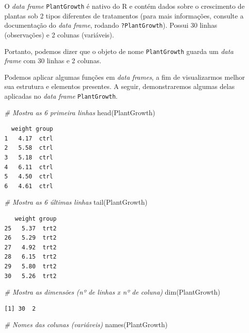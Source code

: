 \documentclass[
  brazilian,
]{book}
\newenvironment{Shaded}{\begin{snugshade}}{\end{snugshade}}
\newcommand{\CommentTok}[1]{\textcolor[rgb]{0.56,0.35,0.01}{\textit{#1}}}
\newcommand{\FunctionTok}[1]{\textcolor[rgb]{0.00,0.00,0.00}{#1}}
\newcommand{\NormalTok}[1]{#1}
\begin{document}
O \emph{data frame} \texttt{PlantGrowth} é nativo do R e contém dados sobre o crescimento de plantas sob 2 tipos diferentes de tratamentos (para mais informações, consulte a documentação do \emph{data frame}, rodando \texttt{?PlantGrowth}). Possui 30 linhas (observações) e 2 colunas (variáveis).

Portanto, podemos dizer que o objeto de nome \texttt{PlantGrowth} guarda um \emph{data frame} com 30 linhas e 2 colunas.

Podemos aplicar algumas funções em \emph{data frames}, a fim de visualizarmos melhor sua estrutura e elementos presentes. A seguir, demonstraremos algumas delas aplicadas no \emph{data frame} \texttt{PlantGrowth}.

\begin{Shaded}
\begin{Highlighting}[]
\CommentTok{\# Mostra as 6 primeira linhas}
\FunctionTok{head}\NormalTok{(PlantGrowth)}
\end{Highlighting}
\end{Shaded}

\begin{verbatim}
  weight group
1   4.17  ctrl
2   5.58  ctrl
3   5.18  ctrl
4   6.11  ctrl
5   4.50  ctrl
6   4.61  ctrl
\end{verbatim}

\begin{Shaded}
\begin{Highlighting}[]
\CommentTok{\# Mostra as 6 últimas linhas}
\FunctionTok{tail}\NormalTok{(PlantGrowth)}
\end{Highlighting}
\end{Shaded}

\begin{verbatim}
   weight group
25   5.37  trt2
26   5.29  trt2
27   4.92  trt2
28   6.15  trt2
29   5.80  trt2
30   5.26  trt2
\end{verbatim}

\begin{Shaded}
\begin{Highlighting}[]
\CommentTok{\# Mostra as dimensões (nº de linhas x nº de coluna)}
\FunctionTok{dim}\NormalTok{(PlantGrowth)}
\end{Highlighting}
\end{Shaded}

\begin{verbatim}
[1] 30  2
\end{verbatim}

\begin{Shaded}
\begin{Highlighting}[]
\CommentTok{\# Nomes das colunas (variáveis)}
\FunctionTok{names}\NormalTok{(PlantGrowth)}
\end{Highlighting}
\end{Shaded}
\end{document}
